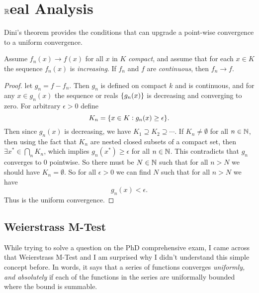 \chapter{$\mathbb{R}$eal Analysis}


Dini's theorem provides the conditions that can upgrade a point-wise convergence to a uniform convergence.
\begin{theorem}
	Assume $ f_n(x)\to f(x) $ for all $ x $ in $ K $ \emph{compact}, and assume that for each $ x\in K $ the sequence $ f_n(x) $ is \emph{increasing}. If $ f_n $ and $ f $ are \emph{continuous}, then $ f_n\to f $.
\end{theorem}
\begin{proof}
	let $ g_n = f-f_n $. Then $ g_n $ is defined on compact $ k $ and is continuous, and for any $ x\in g_n(x) $ the sequence or reals $ \{g_n(x)\} $ is decreasing and converging to zero. For arbitrary $ \epsilon>0 $ define
 	\[ K_n = \{x\in K: g_n(x)\geq \epsilon\}. \] 
 	Then since $ g_n(x) $ is decreasing, we have $ K_1 \supseteq K_2 \supseteq \cdots $. If $ K_n\neq \emptyset $ for all $ n\in \mathbb{N} $, then using the fact that $ K_n $ are nested closed subsets of a compact set, then $ \exists x^*\in \bigcap_n K_n $, which implies $ g_n(x^*)\geq \epsilon $ for all $ n\in \mathbb{N} $. This contradicts that $ g_n $ converges to $ 0 $ pointwise. So there must be $ N\in \mathbb{N} $ such that for all $ n>N $ we should have $ K_n = \emptyset $. So for all $ \epsilon>0 $ we can find $ N $ such that for all $ n>N $ we have 
 	\[ g_n(x) < \epsilon. \]
 	Thus is the uniform convergence.
\end{proof}




\section{Weierstrass M-Test}
While trying to solve a question on the PhD comprehensive exam, I came across that Weierstrass M-Test and I am surprised why I didn't understand this simple concept before. In words, it says that a series of functions converges \emph{uniformly, and absolutely} if each of the functions in the series are uniformally bounded where the bound is summable.

